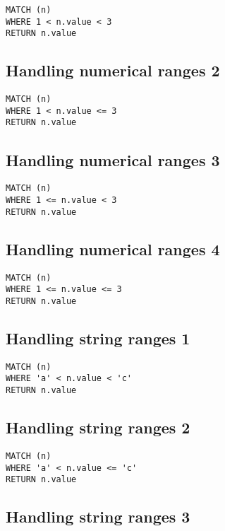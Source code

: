 \begin{lstlisting}
MATCH (n)
WHERE 1 < n.value < 3
RETURN n.value
\end{lstlisting}

\subsection{Handling numerical ranges 2}

\begin{lstlisting}
MATCH (n)
WHERE 1 < n.value <= 3
RETURN n.value
\end{lstlisting}

\subsection{Handling numerical ranges 3}

\begin{lstlisting}
MATCH (n)
WHERE 1 <= n.value < 3
RETURN n.value
\end{lstlisting}

\subsection{Handling numerical ranges 4}

\begin{lstlisting}
MATCH (n)
WHERE 1 <= n.value <= 3
RETURN n.value
\end{lstlisting}

\subsection{Handling string ranges 1}

\begin{lstlisting}
MATCH (n)
WHERE 'a' < n.value < 'c'
RETURN n.value
\end{lstlisting}

\subsection{Handling string ranges 2}

\begin{lstlisting}
MATCH (n)
WHERE 'a' < n.value <= 'c'
RETURN n.value
\end{lstlisting}

\subsection{Handling string ranges 3}

